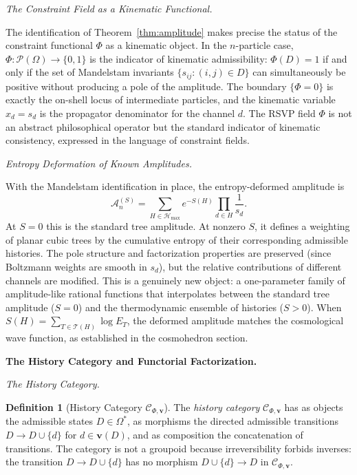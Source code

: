 \documentclass[11pt]{article}
\theoremstyle{plain}
\theoremstyle{definition}
\newtheorem{definition}[theorem]{Definition}
\theoremstyle{remark}
\newcommand{\Phif}{\Phi}
\newcommand{\Sf}{S}
\newcommand{\OmKS}{\Omega}
\newcommand{\Ccat}{\mathcal{C}_{\Phi,\mathbf{v}}}
\newcommand{\Hmax}{\mathcal{H}_{\max}}
\begin{document}
\medskip\noindent\textit{The Constraint Field as a Kinematic Functional.}

The identification of Theorem~\ref{thm:amplitude} makes precise the status
of the constraint functional $\Phif$ as a kinematic object. In the
$n$-particle case, $\Phif: \mathcal{P}(\OmKS) \to \{0,1\}$ is the
indicator of kinematic admissibility: $\Phif(D) = 1$ if and only if the
set of Mandelstam invariants $\{s_{ij} : (i,j) \in D\}$ can simultaneously
be positive without producing a pole of the amplitude. The boundary
$\{\Phif = 0\}$ is exactly the on-shell locus of intermediate particles,
and the kinematic variable $x_d = s_d$ is the propagator denominator for
the channel $d$. The RSVP field $\Phif$ is not an abstract philosophical
operator but the standard indicator of kinematic consistency, expressed in
the language of constraint fields.

\medskip\noindent\textit{Entropy Deformation of Known Amplitudes.}

With the Mandelstam identification in place, the entropy-deformed amplitude
is
\begin{equation}
\label{eq:deformed-amp}
  \mathcal{A}_n^{(\Sf)} = \sum_{H \in \Hmax} e^{-\Sf(H)}
  \prod_{d \in H} \frac{1}{s_d}.
\end{equation}
At $\Sf = 0$ this is the standard tree amplitude. At nonzero $\Sf$, it
defines a weighting of planar cubic trees by the cumulative entropy of
their corresponding admissible histories. The pole structure and
factorization properties are preserved (since Boltzmann weights are smooth
in $s_d$), but the relative contributions of different channels are
modified. This is a genuinely new object: a one-parameter family of
amplitude-like rational functions that interpolates between the standard
tree amplitude ($\Sf = 0$) and the thermodynamic ensemble of histories
($\Sf > 0$). When $\Sf(H) = \sum_{T \in \mathcal{T}(H)} \log E_T$, the
deformed amplitude matches the cosmological wave function, as established
in the cosmohedron section.


\bigskip\noindent\textbf{The History Category and Functorial Factorization.}
\label{sec:categorical}

\medskip\noindent\textit{The History Category.}

\begin{definition}[History Category $\Ccat$]
The \emph{history category} $\Ccat$ has as objects the admissible states $D \in \OmKS^*$, as morphisms the directed admissible transitions $D \to D \cup \{d\}$ for $d \in \mathbf{v}(D)$, and as composition the concatenation of transitions. The category is not a groupoid because irreversibility forbids inverses: the transition $D \to D \cup \{d\}$ has no morphism $D \cup \{d\} \to D$ in $\Ccat$.
\end{definition}
\end{document}
